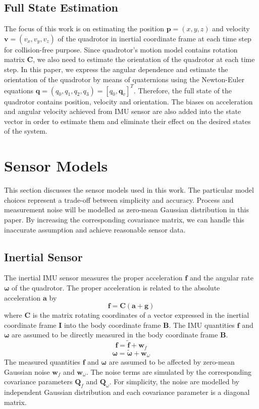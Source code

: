 \documentclass[letterpaper, 10 pt, conference]{ieeeconf}  %
\begin{document}
\subsection{Full State Estimation}
The focus of this work is on estimating the position $\bm{p}=(x,y,z)$ and velocity $\bm{v}=(v_x,v_y,v_z)$ of the quadrotor in inertial coordinate frame at each time step for collision-free purpose. Since quadrotor's motion model contains rotation matrix $\bm{C}$, we also need to estimate the orientation of the quadrotor at each time step. In this paper, we express the angular dependence and estimate the orientation of the quadrotor by means of quaternions using the Newton-Euler equations $\bm{q}=(q_0,q_1,q_2,q_3)=[q_0,\bm{q}_v]^T$. Therefore, the full state of the quadrotor contains position, velocity and orientation. The biases on acceleration and angular velocity achieved from IMU sensor are also added into the state vector in order to estimate them and eliminate their effect on the desired states of the system.

\section{Sensor Models}   
This section discusses the sensor models used in this work. The particular model choices represent a trade-off between simplicity and accuracy. Process and measurement noise will be modelled as zero-mean Gaussian distribution in this paper. By increasing the corresponding covariance matrix, we can handle this inaccurate assumption and achieve reasonable sensor data.
\subsection{Inertial Sensor}
The inertial IMU sensor measures the proper acceleration $\bm{f}$ and the angular rate $\bm{\omega}$ of the quadrotor. The proper acceleration is related to the absolute acceleration $\bm{a}$ by
\begin{equation}
\bm{f}=\bm{C}\left(\bm{a}+\bm{g}\right)
\end{equation}
where $\bm{C}$ is the matrix rotating coordinates of a vector expressed in the inertial coordinate frame $\bm{I}$ into the body coordinate frame $\bm{B}$. The IMU quantities $\bm{f}$ and $\bm{\omega}$ are assumed to be directly measured in the body coordinate frame $\bm{B}$. 
\begin{equation}
	\bm{f} = \bm{\tilde{f}}+\bm{w}_f
\end{equation}
\begin{equation}
	\bm{\omega} = \bm{\tilde{\omega}}+\bm{w}_{\omega}
\end{equation}
The measured quantities $\bm{f}$ and $\bm{\omega}$ are assumed to be affected by zero-mean Gaussian noise $\bm{w}_f$ and $\bm{w}_{\omega}$. The noise terms are simulated by the corresponding covariance parameters $\bm{Q}_f$ and $\bm{Q}_{\omega}$. For simplicity, the noise are modelled by independent Gaussian distribution and each covariance parameter is a diagonal matrix. 
\end{document}

